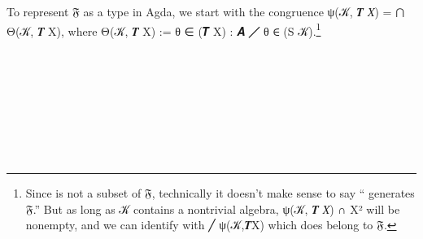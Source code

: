 To represent \af 𝔉 as a type in Agda, we start with the congruence \af ψ(\ab 𝒦, \af 𝑻 \ab 𝑋) \as = ⋂ \af Θ(\ab 𝒦, \af 𝑻 \ab X), where \af Θ(\ab 𝒦, \af 𝑻 \ab X) := \as{\{} \ab θ \aof ∈ (\af 𝑻 \ab X) \as : \ab 𝑨 \af ╱ \ab θ \af ∈ (\aod S \ab 𝒦)\as{\}}.\footnote{Since  is not a subset of \af 𝔉, technically it doesn't make sense to say `` generates \af 𝔉.'' But as long as \ab 𝒦 contains a nontrivial algebra, \af ψ(\ab 𝒦, \af 𝑻 \ab 𝑋) \af ∩ \ab X² will be nonempty, and we can identify  with  \aof ╱ \af ψ(\ab 𝒦,\af 𝑻\ab X) which does belong to \af 𝔉.}
\ccpad
\begin{code}%
\>[0]\AgdaSymbol{\{-\#}\AgdaSpace{}%
\AgdaSpace{}%
\AgdaSpace{}%
\AgdaSpace{}%
\AgdaSpace{}%
\AgdaSymbol{\#-\}}\<%
\\
%
\\[\AgdaEmptyExtraSkip]%
\>[0]\AgdaSpace{}%
\AgdaSpace{}%
\AgdaSpace{}%
\AgdaSpace{}%
\AgdaSymbol{(}\AgdaSymbol{;}\AgdaSpace{}%
\AgdaSymbol{;}\AgdaSpace{}%
\AgdaSymbol{;}\AgdaSpace{}%
\AgdaSymbol{;}\AgdaSpace{}%
\AgdaSymbol{)}\<%
\\
\>[0]\AgdaSpace{}%
\AgdaSpace{}%
\AgdaSpace{}%
\AgdaSpace{}%
\AgdaSymbol{(}\AgdaSymbol{;}\AgdaSpace{}%
\AgdaSymbol{;}\AgdaSpace{}%
\AgdaSymbol{)}\<%
\\
%
\\[\AgdaEmptyExtraSkip]%
%
\>[0]\AgdaSpace{}%
\<%
\\
\>[0][@{}l@{\AgdaIndent{0}}]%
\>[1]\AgdaSymbol{\{}\AgdaSpace{}%
\AgdaSymbol{:}\AgdaSpace{}%
\AgdaSpace{}%
\AgdaSpace{}%
\AgdaSymbol{\}\{}\AgdaSpace{}%
\AgdaSymbol{:}\AgdaSpace{}%
\AgdaSymbol{\}}\<%
\\
%
\>[1]\AgdaSymbol{\{}\AgdaSpace{}%
\AgdaSymbol{:}\AgdaSpace{}%
\AgdaSymbol{\{}\AgdaSpace{}%
\AgdaSpace{}%
\AgdaSymbol{:}\AgdaSpace{}%
\AgdaSymbol{\}\{}\AgdaSpace{}%

\end{code}
